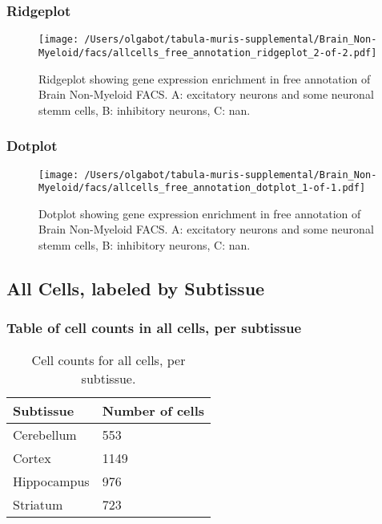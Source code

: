 \newpage
\newpage
\subsubsection{Ridgeplot}
\begin{figure}[h]
\centering
\texttt{[image: /Users/olgabot/tabula-muris-supplemental/Brain\_Non-Myeloid/facs/allcells\_free\_annotation\_ridgeplot\_2-of-2.pdf]}

\caption{ Ridgeplot  showing gene expression enrichment in free annotation of Brain Non-Myeloid FACS. A: excitatory neurons and some neuronal stemm cells, B: inhibitory neurons, C: nan.}
\end{figure}


\newpage
\newpage
\subsubsection{Dotplot}
\begin{figure}[h]
\centering
\texttt{[image: /Users/olgabot/tabula-muris-supplemental/Brain\_Non-Myeloid/facs/allcells\_free\_annotation\_dotplot\_1-of-1.pdf]}

\caption{ Dotplot  showing gene expression enrichment in free annotation of Brain Non-Myeloid FACS. A: excitatory neurons and some neuronal stemm cells, B: inhibitory neurons, C: nan.}
\end{figure}


\newpage
\subsection{All Cells, labeled by Subtissue}
\subsubsection{Table of cell counts in all cells, per subtissue}\begin{table}[h]
\centering
\label{my-label}
\begin{tabular}{@{}ll@{}}
\toprule

Subtissue& Number of cells \\ \midrule
Cerebellum & 553 \\

Cortex & 1149 \\

Hippocampus & 976 \\

Striatum & 723 \\
\bottomrule
\end{tabular}
\caption{Cell counts for all cells, per subtissue.}
\end{table}

